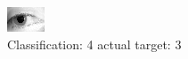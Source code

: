 \begin{figure}[h!]
\begin{center}
\includegraphics[width=0.60\columnwidth]{figures/ID1266_class_4_target_3.png}
\end{center}
\caption{ Classification: 4 actual target: 3}
\label{fig:ID1266_class_4_target_3}
\end{figure}
